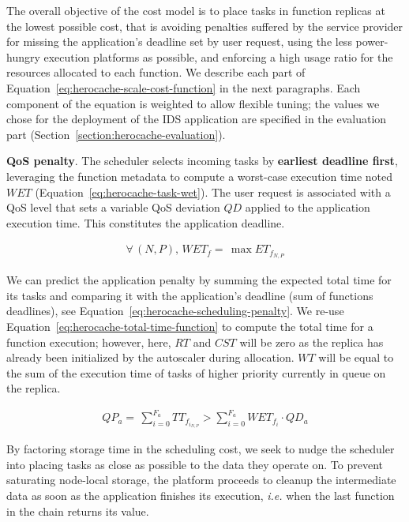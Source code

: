The overall objective of the cost model is to place tasks in function replicas at the lowest possible cost, that is avoiding penalties suffered by the service provider for missing the application's deadline set by user request, using the less power-hungry execution platforms as possible, and enforcing a high usage ratio for the resources allocated to each function. We describe each part of Equation~\ref{eq:herocache-scale-cost-function} in the next paragraphs. Each component of the equation is weighted to allow flexible tuning; the values we chose for the deployment of the IDS application are specified in the evaluation part (Section~\ref{section:herocache-evaluation}).

\textbf{QoS penalty}. The scheduler selects incoming tasks by \textbf{earliest deadline first}, leveraging the function metadata to compute a worst-case execution time noted $WET$ (Equation~\ref{eq:herocache-task-wet}). The user request is associated with a QoS level that sets a variable QoS deviation $QD$ applied to the application execution time. This constitutes the application deadline.

\begin{equation}
\begin{split}
    \forall \, (N, P), \, WET_{f} = \, \max ET_{f_{N, P}}
\end{split}
\label{eq:herocache-task-wet}
\end{equation}

We can predict the application penalty by summing the expected total time for its tasks and comparing it with the application's deadline (sum of functions deadlines), see Equation~\ref{eq:herocache-scheduling-penalty}. We re-use Equation~\ref{eq:herocache-total-time-function} to compute the total time for a function execution; however, here, $RT$ and $CST$ will be zero as the replica has already been initialized by the autoscaler during allocation. $WT$ will be equal to the sum of the execution time of tasks of higher priority currently in queue on the replica.

\begin{equation}
\begin{split}
   QP_{a} = \, \sum_{i = 0}^{F_a} TT_{{f}_{{i}_{N, P}}} > \sum_{i = 0}^{F_a} WET_{f_{i}} \cdot QD_{a}
\end{split}
\label{eq:herocache-scheduling-penalty}
\end{equation}

By factoring storage time in the scheduling cost, we seek to nudge the scheduler into placing tasks as close as possible to the data they operate on. To prevent saturating node-local storage, the platform proceeds to cleanup the intermediate data as soon as the application finishes its execution, \textit{i.e.} when the last function in the chain returns its value.

